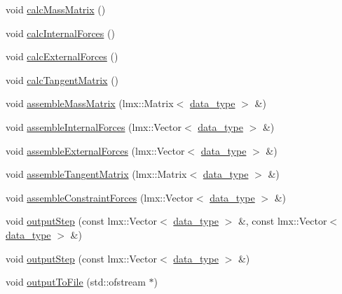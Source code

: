 \begin{DoxyCompactItemize}
\item 
void \hyperlink{classmknix_1_1_system_a3da01e379f5c907be67439ae2b0770c8}{calc\-Mass\-Matrix} ()
\item 
void \hyperlink{classmknix_1_1_system_acbc22a9f660d0f818d461934eb0f1193}{calc\-Internal\-Forces} ()
\item 
void \hyperlink{classmknix_1_1_system_a1f8741218772bc4d2b5a61b1ded98bc4}{calc\-External\-Forces} ()
\item 
void \hyperlink{classmknix_1_1_system_a2dcf37e480b19ef48aab29e484a68f7d}{calc\-Tangent\-Matrix} ()
\item 
void \hyperlink{classmknix_1_1_system_ae7d34bdd8c9c12ba24663f3f2e3ef75c}{assemble\-Mass\-Matrix} (lmx\-::\-Matrix$<$ \hyperlink{namespacemknix_a16be4b246fbf2cceb141e3a179111020}{data\-\_\-type} $>$ \&)
\item 
void \hyperlink{classmknix_1_1_system_a045a56838910627b66dc981205358b78}{assemble\-Internal\-Forces} (lmx\-::\-Vector$<$ \hyperlink{namespacemknix_a16be4b246fbf2cceb141e3a179111020}{data\-\_\-type} $>$ \&)
\item 
void \hyperlink{classmknix_1_1_system_a3f8ef449040805bcc58e3a36a6276888}{assemble\-External\-Forces} (lmx\-::\-Vector$<$ \hyperlink{namespacemknix_a16be4b246fbf2cceb141e3a179111020}{data\-\_\-type} $>$ \&)
\item 
void \hyperlink{classmknix_1_1_system_a4311a423d3a9d7072c0d49031e3bba32}{assemble\-Tangent\-Matrix} (lmx\-::\-Matrix$<$ \hyperlink{namespacemknix_a16be4b246fbf2cceb141e3a179111020}{data\-\_\-type} $>$ \&)
\item 
void \hyperlink{classmknix_1_1_system_a24b1a9bcb9279bbb2384d2bbf94b157c}{assemble\-Constraint\-Forces} (lmx\-::\-Vector$<$ \hyperlink{namespacemknix_a16be4b246fbf2cceb141e3a179111020}{data\-\_\-type} $>$ \&)
\item 
void \hyperlink{classmknix_1_1_system_a22677dbc55080b00290652416ee8bb90}{output\-Step} (const lmx\-::\-Vector$<$ \hyperlink{namespacemknix_a16be4b246fbf2cceb141e3a179111020}{data\-\_\-type} $>$ \&, const lmx\-::\-Vector$<$ \hyperlink{namespacemknix_a16be4b246fbf2cceb141e3a179111020}{data\-\_\-type} $>$ \&)
\item 
void \hyperlink{classmknix_1_1_system_ac161fd48c06a65cfa7b9e27dfbad3f47}{output\-Step} (const lmx\-::\-Vector$<$ \hyperlink{namespacemknix_a16be4b246fbf2cceb141e3a179111020}{data\-\_\-type} $>$ \&)
\item 
void \hyperlink{classmknix_1_1_system_af08300f28c64abfc4065888a643b4bbf}{output\-To\-File} (std\-::ofstream $\ast$)

\end{DoxyCompactItemize}

